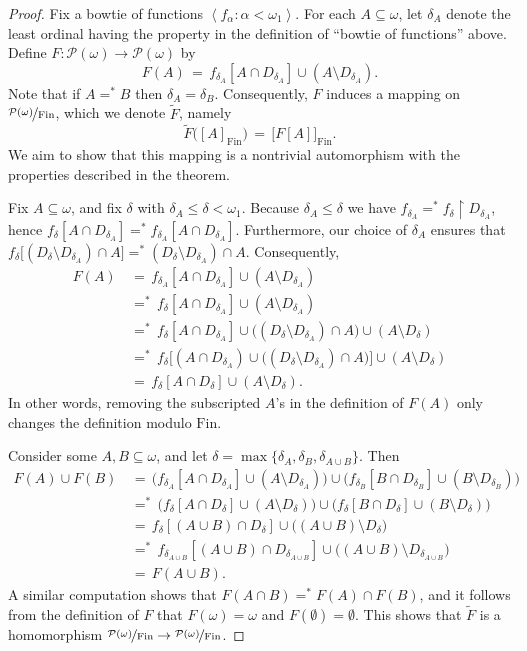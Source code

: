 \documentclass[11pt,leqno]{amsart}
\theoremstyle{definition}
\theoremstyle{remark}
\renewcommand{\P}{\mathcal{P}}
\newcommand{\brackets}[1]{\left\langle #1 \right\rangle}
\newcommand{\seq}[2]{\brackets{#1 \colon #2}}
\newcommand{\<}{\langle}
\renewcommand{\>}{\rangle}
\renewcommand{\a}{\alpha}
\newcommand{\dlt}{\delta}
\newcommand{\w}{\omega}
\newcommand{\0}{\emptyset}
\newcommand{\sub}{\subseteq}
\newcommand{\rest}{\!\restriction\!}
\newcommand{\1}{1\hspace{-1.75mm}1}
\newcommand{\pwmf}{\nicefrac{\mathcal{P}(\w)}{\mathrm{Fin}}}
\begin{document}
\begin{proof}%
Fix a bowtie of functions $\seq{f_\a}{\a < \w_1}$. 
For each $A \sub \w$, let $\dlt_A$ denote the least ordinal having the property in the definition of ``bowtie of functions'' above. 
Define $F: \P(\w) \to \P(\w)$ by 
$$F(A) \,=\, f_{\dlt_A}[A \cap D_{\dlt_A}] \cup ( A \setminus D_{\dlt_A} ).$$
Note that if $A =^* B$ then $\dlt_A = \dlt_B$. Consequently, $F$ induces a mapping on $\pwmf$, which we denote $\tilde F$, namely
$$\tilde F\big([A]_\mathrm{Fin}\big) \,=\, \big[F[A]\big]_\mathrm{Fin}.$$
We aim to show that this mapping is a nontrivial automorphism with the properties described in the theorem.

Fix $A \sub \w$, and fix $\dlt$ with $\dlt_A \leq \dlt < \w_1$. 
Because $\dlt_A \leq \dlt$ we have $f_{\dlt_A} =^* f_\dlt \rest D_{\dlt_A}$, hence $f_\dlt[A \cap D_{\dlt_A}] =^* f_{\dlt_A}[A \cap D_{\dlt_A}]$. Furthermore, our choice of $\dlt_A$ ensures that $f_\dlt \big[(D_\dlt \setminus D_{\dlt_A}) \cap A \big] =^* (D_\dlt \setminus D_{\dlt_A} ) \cap A$. Consequently, 
\begin{align*}
F(A) &\,=\, f_{\dlt_A}[A \cap D_{\dlt_A}] \cup ( A \setminus D_{\dlt_A} ) \\
&\,=^*\, f_\dlt[A \cap D_{\dlt_A}] \cup ( A \setminus D_{\dlt_A} ) \\
&\,=^*\, f_\dlt[A \cap D_{\dlt_A}] \cup \big( (D_\dlt \setminus D_{\dlt_A}) \cap A \big) \cup ( A \setminus D_\dlt ) \\
&\,=^*\, f_\dlt \big[ (A \cap D_{\dlt_A}) \cup \big( (D_\dlt \setminus D_{\dlt_A}) \cap A \big) \big] \cup ( A \setminus D_\dlt ) \\ 
&\,=\, f_\dlt[A \cap D_\dlt] \cup (A \setminus D_\dlt).
\end{align*}
In other words, removing the subscripted $A$'s in the definition of $F(A)$ only changes the definition modulo $\mathrm{Fin}$. 

Consider some $A,B \sub \w$, and let $\dlt = \max\{\dlt_A,\dlt_B,\dlt_{A \cup B}\}$. Then 
\begin{align*}
F(A) \cup F(B) &\,=\, \big( f_{\dlt_A}[A \cap D_{\dlt_A}] \cup ( A \setminus D_{\dlt_A} ) \big) \cup \big( f_{\dlt_B}[B \cap D_{\dlt_B}] \cup ( B \setminus D_{\dlt_B} ) \big) \\ 
&\,=^*\, \big( f_\dlt[A \cap D_\dlt] \cup ( A \setminus D_\dlt ) \big) \cup \big( f_\dlt[B \cap D_\dlt] \cup ( B \setminus D_\dlt ) \big) \\ 
&\,=\, f_\dlt[(A \cup B) \cap D_\dlt] \cup \big( (A \cup B) \setminus D_\dlt \big) \\ 
&\,=^*\, f_{\dlt_{A \cup B}}[(A \cup B) \cap D_{\dlt_{A \cup B}}] \cup \big( (A \cup B) \setminus D_{\dlt_{A \cup B}} \big) \\ 
&\,=\, F(A \cup B).
\end{align*}
A similar computation shows that $F(A \cap B) =^* F(A) \cap F(B)$, and it follows from the definition of $F$ that $F(\w) = \w$ and $F(\0) = \0$. 
This shows that $\tilde F$ is a homomorphism $\pwmf \to \pwmf$. 


\end{proof}
\end{document}
